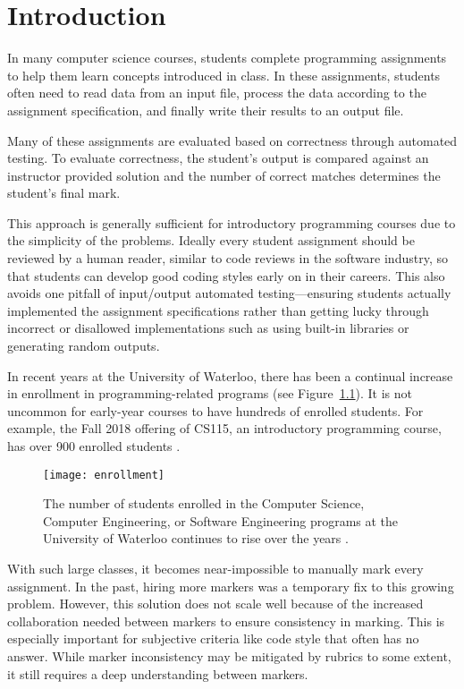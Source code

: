 \chapter{Introduction}

In many computer science courses, students complete programming assignments to help them learn concepts introduced in class. In these assignments, students often need to read data from an input file, process the data according to the assignment specification, and finally write their results to an output file.

Many of these assignments are evaluated based on correctness through automated testing. To evaluate correctness, the student's output is compared against an instructor provided solution and the number of correct matches determines the student's final mark.

This approach is generally sufficient for introductory programming courses due to the simplicity of the problems. Ideally every student assignment should be reviewed by a human reader, similar to code reviews in the software industry, so that students can develop good coding styles early on in their careers. This also avoids one pitfall of input/output automated testing---ensuring students actually implemented the assignment specifications rather than getting lucky through incorrect or disallowed implementations such as using built-in libraries or generating random outputs.

In recent years at the University of Waterloo, there has been a continual increase in enrollment in programming-related programs (see Figure~\ref{fig:intro-enrollment}). It is not uncommon for early-year courses to have hundreds of enrolled students. For example, the Fall 2018 offering of CS115, an introductory programming course, has over 900 enrolled students \cite{uwaterloo-cs115}.

\begin{figure}
\texttt{[image: enrollment]}
\caption[Enrollment at University of Waterloo]{The number of students enrolled in the Computer Science, Computer Engineering, or Software Engineering programs at the University of Waterloo continues to rise over the years \cite{uwaterloo-enrollment}.}
\label{fig:intro-enrollment}
\end{figure}

With such large classes, it becomes near-impossible to manually mark every assignment. In the past, hiring more markers was a temporary fix to this growing problem. However, this solution does not scale well because of the increased collaboration needed between markers to ensure consistency in marking. This is especially important for subjective criteria like code style that often has no  answer. While marker inconsistency may be mitigated by rubrics to some extent, it still requires a deep understanding between markers.

